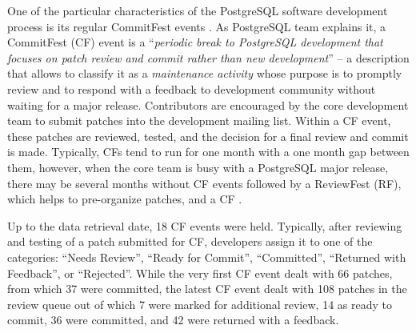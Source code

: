 One of the particular characteristics of the PostgreSQL software development process is its regular CommitFest events \cite{commit-fest}. As PostgreSQL team explains it, a CommitFest (CF) event is a ``\textit{periodic break to PostgreSQL development that focuses on patch review and commit rather than new development}'' -- a description that allows to classify it as a \textit{maintenance activity} whose purpose is to promptly review and to respond with a feedback to development community without waiting for a major release. Contributors are encouraged by the core development team to submit patches into the development mailing list. Within a CF event, these patches are reviewed, tested, and the decision for a final review and commit is made.  Typically, CFs tend to run for one month with a one month gap between them, however, when the core team is busy with a PostgreSQL major release, there may be several months without CF events followed by a ReviewFest (RF), which helps to pre-organize patches, and a CF . 

Up to the data retrieval date, 18 CF events were held. Typically, after reviewing and testing of a patch submitted for CF, developers assign it to one of the categories: ``Needs Review'', ``Ready for Commit'', ``Committed'', ``Returned with Feedback'', or ``Rejected''. While the very first CF event dealt with 66 patches, from which 37 were committed, the latest CF event dealt with 108 patches in the review queue out of which 7 were marked for additional review, 14 as ready to commit, 36 were committed, and 42 were returned with a feedback.


